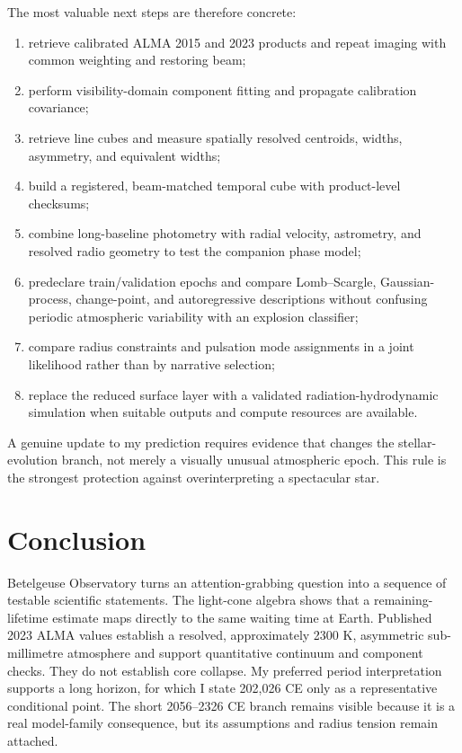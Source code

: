 \documentclass[11pt,a4paper]{article}
\begin{document}
The most valuable next steps are therefore concrete:

\begin{enumerate}
  \item retrieve calibrated ALMA 2015 and 2023 products and repeat imaging with common weighting and restoring beam;
  \item perform visibility-domain component fitting and propagate calibration covariance;
  \item retrieve line cubes and measure spatially resolved centroids, widths, asymmetry, and equivalent widths;
  \item build a registered, beam-matched temporal cube with product-level checksums;
  \item combine long-baseline photometry with radial velocity, astrometry, and resolved radio geometry to test the companion phase model;
  \item predeclare train/validation epochs and compare Lomb--Scargle, Gaussian-process, change-point, and autoregressive descriptions without confusing periodic atmospheric variability with an explosion classifier;
  \item compare radius constraints and pulsation mode assignments in a joint likelihood rather than by narrative selection;
  \item replace the reduced surface layer with a validated radiation-hydrodynamic simulation when suitable outputs and compute resources are available.
\end{enumerate}

A genuine update to my prediction requires evidence that changes the stellar-evolution branch, not merely a visually unusual atmospheric epoch. This rule is the strongest protection against overinterpreting a spectacular star.

\section{Conclusion}

Betelgeuse Observatory turns an attention-grabbing question into a sequence of testable scientific statements. The light-cone algebra shows that a remaining-lifetime estimate maps directly to the same waiting time at Earth. Published 2023 ALMA values establish a resolved, approximately 2300 K, asymmetric sub-millimetre atmosphere and support quantitative continuum and component checks. They do not establish core collapse. My preferred period interpretation supports a long horizon, for which I state 202,026 CE only as a representative conditional point. The short 2056--2326 CE branch remains visible because it is a real model-family consequence, but its assumptions and radius tension remain attached.
\end{document}
